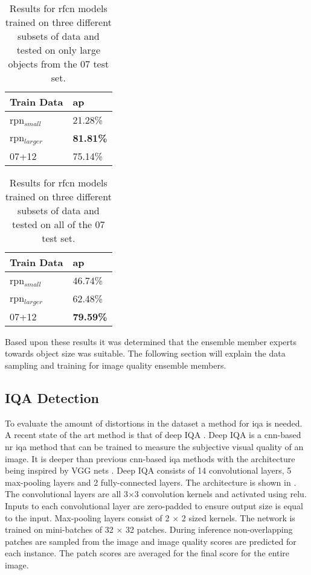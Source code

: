 \documentclass[a4paper,twoside]{article}
\begin{document}
\begin{table}[h]
\centering
\caption{Results for \gls{rfcn} models trained on three different subsets of data and tested on only large objects from the 07 test set.}
\label{tab:large07res}
\begin{tabular}{|l|l|}
\hline
\textbf{Train Data} & \textbf{\gls{ap}}      \\ \hline
\gls{rpn}$_{small}$      & 21.28\% \\ \hline
\gls{rpn}$_{larger}$      & \textbf{81.81\%} \\ \hline
07+12        & 75.14\% \\ \hline
\end{tabular}
\end{table}


\begin{table}[h]
\centering
\caption{Results for \gls{rfcn} models trained on three different subsets of data and tested on all of the 07 test set.}
\label{tab:alldatares}
\begin{tabular}{|l|l|}
\hline
\textbf{Train Data} & \textbf{\gls{ap}}      \\ \hline
\gls{rpn}$_{small}$      & 46.74\% \\ \hline
\gls{rpn}$_{larger}$      & 62.48\% \\ \hline
07+12        & \textbf{79.59\%} \\ \hline
\end{tabular}
\end{table}

Based upon these results it was determined that the ensemble member experts towards object size was suitable. The following section will explain the data sampling and training for image quality ensemble members.


\subsection{IQA Detection}
To evaluate the amount of distortions in the dataset a method for \gls{iqa} is needed. A recent state of the art method is that of deep IQA \cite{deepiqa}. Deep IQA is a \gls{cnn}-based \gls{nr} \gls{iqa} method that can be trained to measure the subjective visual quality of an image. It is deeper than previous \gls{cnn}-based \gls{iqa} methods with the architecture being inspired by VGG nets \cite{vgg16}. Deep IQA consists of 14 convolutional layers, 5 max-pooling layers and 2 fully-connected layers. The architecture is shown in . The convolutional layers are all 3$\times$3 convolution kernels and activated using \gls{relu}. Inputs to each convolutional layer are zero-padded to ensure output size is equal to the input. Max-pooling layers consist of 2 $\times$ 2 sized kernels. The network is trained on mini-batches of 32 $\times$ 32 patches. During inference non-overlapping patches are sampled from the image and image quality scores are predicted for each instance. The patch scores are averaged for the final score for the entire image. 
\end{document}
